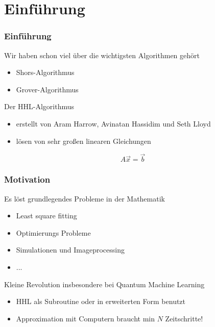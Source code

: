 \section{Einführung}


    \begin{frame}
        \frametitle{Einführung}

        Wir haben schon viel über die wichtigsten Algorithmen gehört
        \begin{itemize}
            \item  Shors-Algorithmus
            \item  Grover-Algorithmus
        \end{itemize}

        \hfill

        Der HHL-Algorithmus
        \begin{itemize}
            \item  erstellt von Aram Harrow, Avinatan Hassidim und Seth Lloyd 
            \item  lösen von sehr großen linearen Gleichungen 
        \end{itemize}

        $$ A \vec{x} = \vec{b} $$

    \end{frame}



    \begin{frame}
        \frametitle{Motivation}

        Es löst grundlegendes Probleme in der Mathematik
        \begin{itemize}
            \item   Least square fitting 
            \item   Optimierungs Probleme
            \item   Simulationen und Imageprocessing
            \item   ...
       \end{itemize}

        \hfil

        Kleine Revolution insbesondere bei Quantum Machine Learning
        \begin{itemize}
            \item HHL als Subroutine oder in erweiterten Form benutzt
            \item Approximation mit Computern braucht min $N$ Zeitschritte!
       \end{itemize}


    \end{frame}

